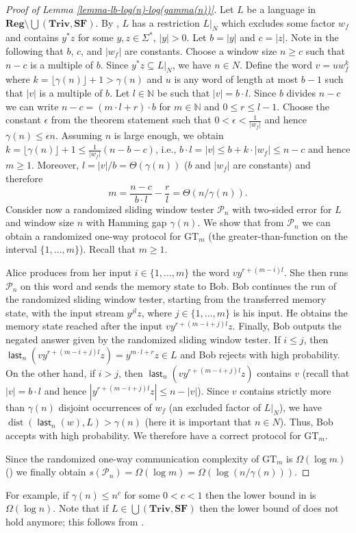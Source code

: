 \documentclass{article}\usepackage[a4paper,margin=20mm]{geometry}
\newcommand{\N}{\mathbb{N}}
\renewcommand{\P}{\mathcal{P}}
\DeclareMathOperator{\last}{\mathsf{last}}
\DeclareMathOperator{\dist}{dist}
\newcommand{\Reg}{\mathbf{Reg}}
\newcommand{\Triv}{\mathbf{Triv}}
\newcommand{\SF}{\mathbf{SF}}
\renewcommand{\geq}{\geqslant}
\renewcommand{\leq}{\leqslant}
\renewcommand{\ge}{\geq}
\renewcommand{\le}{\leq}
\begin{document}
\begin{proof}[Proof of Lemma \ref{lemma-lb-log(n)-log(gamma(n))}]
Let $L$ be a language in $\Reg \setminus  \bigcup(\Triv, \SF)$. By ,
$L$ has a restriction $L|_N$ which excludes some factor $w_f$
and contains $y^*z$ for some $y,z \in \Sigma^*$, $|y| > 0$.
Let $b = |y|$ and $c = |z|$. Note in the following that $b$, $c$, and $|w_f|$ are constants.
Choose a window size $n \ge c$ such that $n-c$ is a multiple of $b$. Since $y^*z \subseteq L|_N$, we have $n \in N$.
Define the word $v = u w_f^k$ where $k = \lfloor \gamma(n) \rfloor + 1 > \gamma(n)$ 
and $u$ is any word of length at most $b-1$ such that $|v|$ is a multiple of $b$. Let $l \in \N$ be such that $|v| = b \cdot l$. Since $b$ divides $n-c$ we can write
$n-c = (m \cdot l + r) \cdot b$ for $m \in \N$ and $0 \le r \le l-1$.
Choose the constant $\epsilon$ from the theorem statement such that
$0 < \epsilon < \frac{1}{|w_f|}$ and hence $\gamma(n) \leq \epsilon n$. 
 Assuming $n$ is large enough, we obtain 
$k =  \lfloor \gamma(n) \rfloor + 1 \leq \frac{1}{|w_f|} (n-b-c)$, i.e., 
$b \cdot l = |v| \leq b+ k \cdot |w_f|  \leq n-c$ and hence $m \geq 1$.
Moreover,  $l = |v|/b = \Theta(\gamma(n))$ ($b$ and $|w_f|$ are constants) and therefore 
$$
m = \frac{n-c}{b \cdot l} - \frac{r}{l} = \Theta(n/\gamma(n)).
$$
Consider now a randomized sliding window tester $\P_n$ with two-sided error for $L$ and window size $n$
with Hamming gap $\gamma(n)$.
We show that from $\P_n$ we can obtain a randomized one-way protocol for $\mathrm{GT}_m$ (the greater-than-function on the interval $\{1,\ldots,m\}$). Recall that $m \geq 1$.

Alice produces from her input $i \in \{1,\ldots,m\}$ the word 
$v y^{r+ (m-i) l}$.
She then runs $\P_n$ on this word and sends the memory state to Bob.
Bob continues the run of the randomized sliding window tester, starting from the transferred memory state,
with the input stream $y^{j l} z$, where $j \in \{1,\ldots,m\}$ is his input.
He obtains the memory state reached after the input $v y^{r+(m-i+j) l} z$.
Finally, Bob outputs the negated answer given by the randomized sliding window tester.
If $i \le j$, then $\last_n(v y^{r+(m-i+j) l} z) = y^{m \cdot l + r} z  \in L$ and Bob rejects with high probability.
On the other hand, if $i > j$, then $\last_n(v y^{r+ (m-i+j) l} z)$ contains $v$ (recall that $|v| = b \cdot l$ and hence 
$|y^{r+(m-i+j) l} z| \leq n-|v|$). Since $v$ contains strictly more than $\gamma(n)$ disjoint occurrences of $w_f$ (an excluded factor of $L|_N$),
we have $\dist(\last_n(w),L) > \gamma(n)$ (here it is important that $n \in N$).
Thus, Bob accepts with high probability. We therefore have a correct protocol for $\mathrm{GT}_m$.

Since the randomized one-way communication complexity of $\mathrm{GT}_m$ is $\Omega(\log m)$ () we finally obtain
$s(\P_n) = \Omega(\log m) = \Omega(\log(n/\gamma(n)))$.
\end{proof}
For example, if $\gamma(n) \le n^c$ for some $0 < c < 1$ then the lower bound in  is $\Omega(\log n)$.
Note that if $L \in \bigcup(\Triv,\SF)$ then the lower bound of  does not hold anymore;
this follows from .
\end{document}
